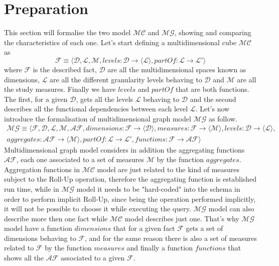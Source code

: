 \documentclass[12pt,a4paper]{report}
\newcommand\multidimensionalCube{\mathcal{MC}}
\newcommand\fact{\mathcal{F}}
\newcommand\dimension{\mathcal{D}}
\newcommand\level{\mathcal{L}}
\newcommand\measure{\mathcal{M}}
\newcommand\levelsFunLabel{levels}
\newcommand\dimensions{dimensions}
\newcommand\levelsFundefinition{\levelsFunLabel:\dimension\rightarrow \langle \level \rangle}
\newcommand\dimensionsFundefinition{\dimensions:\fact\rightarrow \langle \dimension \rangle}
\newcommand\multidimensionalGraph{\mathcal{MG}}
\newcommand\aggregatingFunction{\mathcal{AF}}
\newcommand\aggregatingFunctionFunLabel{aggregates}
\newcommand\aggregatingFunctionDefinition{\aggregatingFunctionFunLabel: \aggregatingFunction \rightarrow \langle \measure \rangle}
\newcommand\partOfFunLabel{partOf}
\newcommand\partOfFunDefinition{\partOfFunLabel:\level \rightarrow \level'}
\newcommand\measuresFunLabel{measures}
\newcommand\measuresFunDefinition{\measuresFunLabel:\fact \rightarrow \set{\measure}}
\newcommand\functionsFunLabel{functions}
\newcommand\functionsFunDefinition{\functionsFunLabel:\fact\rightarrow \aggregatingFunction}
\newcommand\set[1]{\langle #1 \rangle}
\begin{document}
\section{Preparation}
This section will formalise the two model $\multidimensionalCube$ and $\multidimensionalGraph$, showing and comparing the characteristics of each one.
%
Let's start defining a multidimensional cube $\multidimensionalCube$ as
\begin{equation}
    \fact \equiv \langle \dimension, \level, \measure, \levelsFundefinition, \partOfFunDefinition \rangle
\end{equation}
where $\fact$ is the described fact, $\dimension$ are all the multidimensional spaces known as dimensions, $\level$ are all the different granularity levels behaving to $\dimension$ and $\measure$ are all the study measures.
%
Finally we have $\levelsFunLabel$ and $\partOfFunLabel$ that are both functions.
%
The first, for a given $\dimension$, gets all the levels $\level$ behaving to $\dimension$ and the second describes all the functional dependencies between each level $\level$.
%
Let's now introduce the formalisation of multidimensional graph model $\multidimensionalGraph$ as follow.
%
\begin{equation}
\begin{split}
    \multidimensionalGraph \equiv \langle \fact, \dimension, \level, \measure, \aggregatingFunction, \dimensionsFundefinition, \measuresFunDefinition, \levelsFundefinition, \\\aggregatingFunctionDefinition, \partOfFunDefinition, \functionsFunDefinition\rangle
\end{split}
\end{equation}
%
Multidimensional graph model considers in addition the aggregating functions $\aggregatingFunction$, each one associated to a set of measures $\measure$ by the function $\aggregatingFunctionFunLabel$.
%
Aggregation functions in $\multidimensionalCube$ model are just related to the kind of measures subject to the Roll-Up operation, therefore the aggregating function is established run time, while in $\multidimensionalGraph$ model it needs to be "hard-coded" into the schema in order to perform implicit Roll-Up, since being the operation performed implicitly, it will not be possible to choose it while executing the query.
%
$\multidimensionalGraph$ model can also describe more then one fact while $\multidimensionalCube$ model describes just one.
%
That's why $\multidimensionalGraph$ model have a function $\dimensions$ that for a given fact $\fact$ gets a set of dimensions behaving to $\fact$, and for the same reason there is also a set of measures related to $\fact$ by the function $\measuresFunLabel$ and finally a function $\functionsFunLabel$ that shows all the $\aggregatingFunction$ associated to a given $\fact$.
\end{document}
